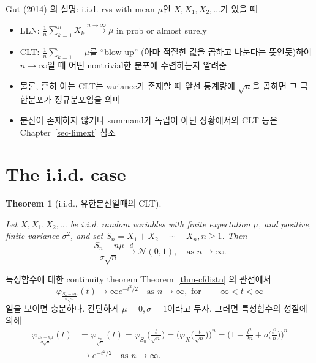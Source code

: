 \documentclass[
  letterpaper,
  DIV=11,
  numbers=noendperiod]{scrreprt}
\theoremstyle{definition}
\theoremstyle{plain}
\newtheorem{theorem}{Theorem}[chapter]
\theoremstyle{plain}
\theoremstyle{definition}
\theoremstyle{plain}
\theoremstyle{definition}
\theoremstyle{remark}
\begin{document}
Gut (2014) 의 설명: i.i.d. rvs with mean \(\mu\)인
\(X, X_1, X_2,\ldots\)가 있을 때

\begin{itemize}
\item
  LLN:
  \(\frac{1}{n}\sum_{k=1}^n X_k \stackrel{n\rightarrow\infty}{\longrightarrow} \mu\)
  in prob or almost surely
\item
  CLT: \(\frac{1}{n}\sum_{k=1}-\mu\)를 ``blow up'' (아마 적절한 값을
  곱하고 나눈다는 뜻인듯)하여 \(n\rightarrow \infty\)일 때 어떤
  nontrivial한 분포에 수렴하는지 알려줌
\item
  물론, 흔히 아는 CLT는 variance가 존재할 때 앞선 통계량에
  \(\sqrt{n}\)을 곱하면 그 극한분포가 정규분포임을 의미
\item
  분산이 존재하지 않거나 summand가 독립이 아닌 상황에서의 CLT 등은
  Chapter~\ref{sec-limext} 참조
\end{itemize}

\section{The i.i.d. case}\label{the-i.i.d.-case}

\begin{theorem}[i.i.d., 유한분산일때의
CLT]\protect\hypertarget{thm-clt}{}\label{thm-clt}

Let \(X, X_1, X_2, \ldots\) be i.i.d. random variables with finite
expectation \(\mu\), and positive, finite variance \(\sigma^2\), and set
\(S_n = X_1 + X_2 + \cdots + X_n, n\geq 1\). Then \[
\frac{S_n - n\mu}{\sigma \sqrt{n}} \stackrel{d}{\rightarrow}\mathcal{N}(0,1), \quad{} \text{as }n \rightarrow\infty.
\]

\end{theorem}

\begin{tcolorbox}[enhanced jigsaw, left=2mm, arc=.35mm, leftrule=.75mm, colback=white, title=\textcolor{quarto-callout-note-color}{\faInfo}\hspace{0.5em}{Proof}, rightrule=.15mm, breakable, bottomrule=.15mm, coltitle=black, opacitybacktitle=0.6, opacityback=0, toptitle=1mm, titlerule=0mm, toprule=.15mm, colbacktitle=quarto-callout-note-color!10!white, bottomtitle=1mm, colframe=quarto-callout-note-color-frame]

특성함수에 대한 continuity theorem Theorem~\ref{thm-cfdistn} 의 관점에서
\[
\varphi_{\frac{S_n - n\mu}{\sigma \sqrt{n}}} (t) \rightarrow \infty e^{-t^2/2} \quad{} \text{as }n \rightarrow\infty, \text{ for} \quad{} -\infty < t < \infty
\] 일을 보이면 충분하다. 간단하게 \(\mu=0, \sigma=1\)이라고 두자. 그러면
특성함수의 성질에 의해 \[
\begin{align*}
\varphi_{\frac{S_n - n\mu}{\sigma \sqrt{n}}} (t) &=\varphi_{\frac{S_n }{\sqrt{n}}} (t) = \varphi_{S_n}\Big( \frac{t}{\sqrt{n}} \Big) = \Big( \varphi_X \Big( \frac{t}{\sqrt{n}}\Big)\Big)^n = \Big( 1- \frac{t^2}{2n} + o\Big( \frac{t^2}{n}\Big) \Big)^n\\
&\rightarrow e^{-t^2/2} \quad{} \text{as }n \rightarrow\infty.
\end{align*}
\]

\end{tcolorbox}
\end{document}
